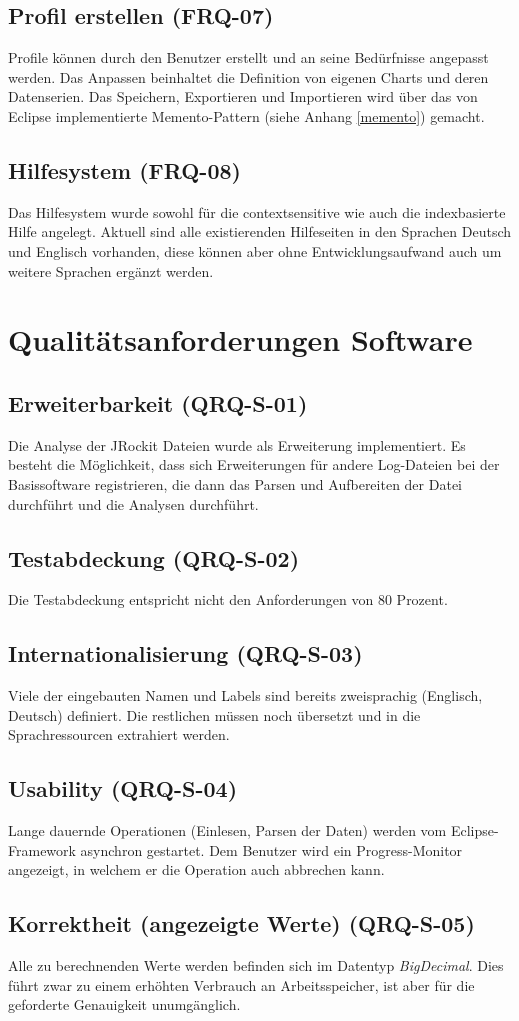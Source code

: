 \subsection{Profil erstellen (FRQ-07)}
Profile können durch den Benutzer erstellt und an seine Bedürfnisse angepasst werden. Das Anpassen beinhaltet die Definition von eigenen Charts und deren Datenserien. Das Speichern, Exportieren und Importieren wird über das von Eclipse implementierte Memento-Pattern (siehe Anhang \ref{memento}) gemacht.

\subsection{Hilfesystem (FRQ-08)}
Das Hilfesystem wurde sowohl für die contextsensitive wie auch die indexbasierte Hilfe angelegt. Aktuell sind alle existierenden Hilfeseiten in den Sprachen Deutsch und Englisch vorhanden, diese können aber ohne Entwicklungsaufwand auch um weitere Sprachen ergänzt werden. 

\section{Qualitätsanforderungen Software}
\subsection{Erweiterbarkeit (QRQ-S-01)}
Die Analyse der JRockit Dateien wurde als Erweiterung implementiert. Es besteht die Möglichkeit, dass sich Erweiterungen für andere Log-Dateien bei der Basissoftware registrieren, die dann das Parsen und Aufbereiten der Datei durchführt und die Analysen durchführt.

\subsection{Testabdeckung (QRQ-S-02)}
Die Testabdeckung entspricht nicht den Anforderungen von 80 Prozent. 

\subsection{Internationalisierung (QRQ-S-03)}
Viele der eingebauten Namen und Labels sind bereits zweisprachig (Englisch, Deutsch) definiert. Die restlichen müssen noch übersetzt und in die Sprachressourcen extrahiert werden.

\subsection{Usability (QRQ-S-04)}
Lange dauernde Operationen (Einlesen, Parsen der Daten) werden vom Eclipse-Framework asynchron gestartet. Dem Benutzer wird ein Progress-Monitor angezeigt, in welchem er die Operation auch abbrechen kann.

\subsection{Korrektheit (angezeigte Werte) (QRQ-S-05)}
Alle zu berechnenden Werte werden befinden sich im Datentyp \textit{BigDecimal}. Dies führt zwar zu einem erhöhten Verbrauch an Arbeitsspeicher, ist aber für die geforderte Genauigkeit unumgänglich.